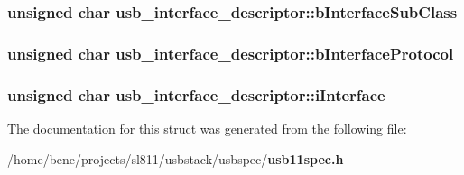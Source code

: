 \subsubsection{\setlength{\rightskip}{0pt plus 5cm}unsigned char {\bf usb\_\-interface\_\-descriptor::b\-Interface\-Sub\-Class}}\label{structusb__interface__descriptor_64ad7e72dd208eccbd9d23f6db704229}


\subsubsection{\setlength{\rightskip}{0pt plus 5cm}unsigned char {\bf usb\_\-interface\_\-descriptor::b\-Interface\-Protocol}}\label{structusb__interface__descriptor_eed75b64584e3ae65f353072e3775f07}


\subsubsection{\setlength{\rightskip}{0pt plus 5cm}unsigned char {\bf usb\_\-interface\_\-descriptor::i\-Interface}}\label{structusb__interface__descriptor_f865e728272cafbea262c5952e21c628}




The documentation for this struct was generated from the following file:\begin{CompactItemize}
\item 
/home/bene/projects/sl811/usbstack/usbspec/{\bf usb11spec.h}\end{CompactItemize}

